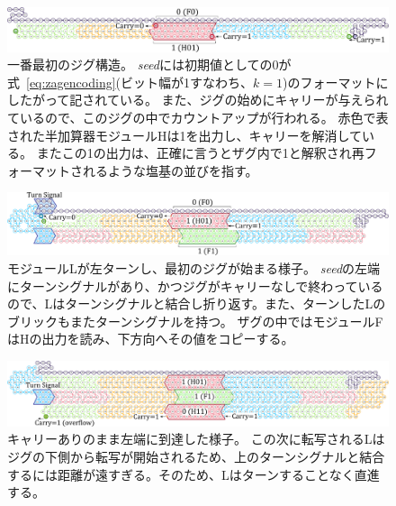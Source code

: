 \documentclass[a4j,11pt]{article}
\begin{document}
%
%
%
\begin{figure}[p]
\centering
\includegraphics[width=\linewidth]{fig/svg/CounterEx5_1.pdf}
\caption{
一番最初のジグ構造。
\textit{seed}には初期値としての0が式~\eqref{eq:zagencoding}(ビット幅が1すなわち、$k=1$)のフォーマットにしたがって記されている。
また、ジグの始めにキャリーが与えられているので、このジグの中でカウントアップが行われる。
赤色で表された半加算器モジュールHは1を出力し、キャリーを解消している。
またこの1の出力は、正確に言うとザグ内で1と解釈され再フォーマットされるような塩基の並びを指す。
}

\label{fig:counter1stzig}
\end{figure}

\begin{figure}[h]
\centering
\includegraphics[width=\linewidth]{fig/svg/CounterEx11_1.pdf}
\caption{
モジュールLが左ターンし、最初のジグが始まる様子。
\textit{seed}の左端にターンシグナルがあり、かつジグがキャリーなしで終わっているので、Lはターンシグナルと結合し折り返す。また、ターンしたLのブリックもまたターンシグナルを持つ。
ザグの中ではモジュールFはHの出力を読み、下方向へその値をコピーする。
}
\label{fig:counter1stzag}
\end{figure}

\begin{figure}[h]
\centering
\includegraphics[width=\linewidth]{fig/svg/CounterEx13_1.pdf}
\caption{
キャリーありのまま左端に到達した様子。
この次に転写されるLはジグの下側から転写が開始されるため、上のターンシグナルと結合するには距離が遠すぎる。そのため、Lはターンすることなく直進する。
}
\label{fig:overflowex1}
\end{figure}
%
%
%
\end{document}
